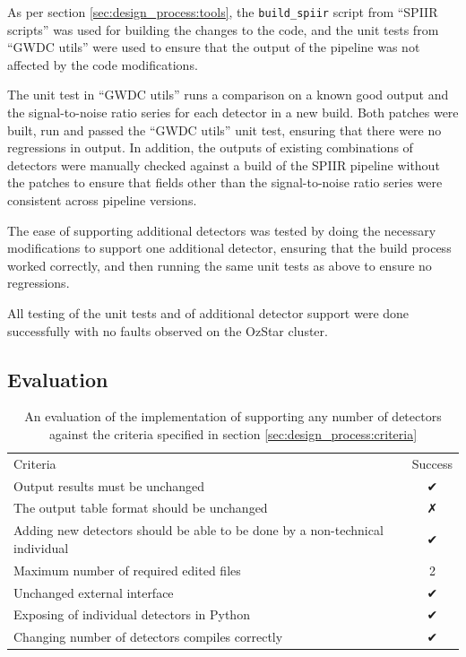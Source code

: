 \documentclass{article}
\begin{document}
As per section \ref{sec:design_process:tools}, the \texttt{build\_spiir} script from ``SPIIR scripts'' was used for building the changes to the code, and the unit tests from ``GWDC utils'' were used to ensure that the output of the pipeline was not affected by the code modifications.

The unit test in ``GWDC utils'' runs a comparison on a known good output and the signal-to-noise ratio series for each detector in a new build.
Both patches were built, run and passed the ``GWDC utils'' unit test, ensuring that there were no regressions in output.
In addition, the outputs of existing combinations of detectors were manually checked against a build of the SPIIR pipeline without the patches to ensure that fields other than the signal-to-noise ratio series were consistent across pipeline versions.

The ease of supporting additional detectors was tested by doing the necessary modifications to support one additional detector, ensuring that the build process worked correctly, and then running the same unit tests as above to ensure no regressions.

All testing of the unit tests and of additional detector support were done successfully with no faults observed on the OzStar cluster.

\subsection{Evaluation} \label{sec:final_design:evaluation}

\begin{table}[t]
    \centering
    \begin{tabular}{lc}
        \rowcolor[HTML]{656565}
        {\color[HTML]{FFFFFF} Criteria} & {\color[HTML]{FFFFFF} Success} \\
        Output results must be unchanged & {\unicodefont ✔} \\
        The output table format should be unchanged & {\unicodefont ✗} \\
        Adding new detectors should be able to be done by a non-technical individual & {\unicodefont ✔} \\
        Maximum number of required edited files & 2 \\
        Unchanged external interface & {\unicodefont ✔} \\
        Exposing of individual detectors in Python & {\unicodefont ✔} \\
        Changing number of detectors compiles correctly & {\unicodefont ✔} \\
    \end{tabular}
    \caption{An evaluation of the implementation of supporting any number of detectors against the criteria specified in section \ref{sec:design_process:criteria}}
    \label{tab:eval}
\end{table}
\end{document}
